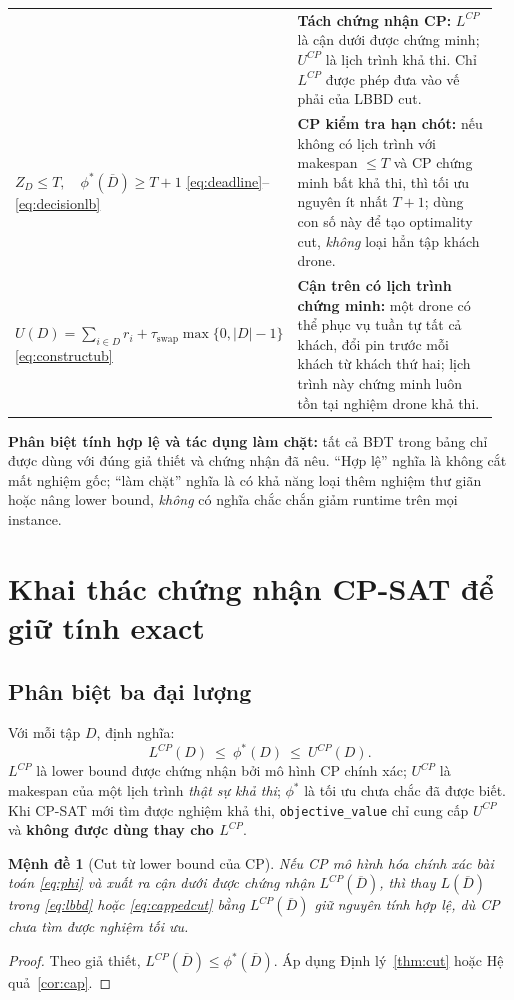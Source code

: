 \documentclass[11pt,a4paper]{article}
\theoremstyle{definition}
\theoremstyle{plain}
\newtheorem{proposition}{Mệnh đề}[section]
\theoremstyle{remark}
\newcommand{\sw}{\tau_{\mathrm{swap}}}
\newcommand{\opt}{\phi^*}
\newcommand{\barD}{\overline D}
\begin{document}
\begin{longtable}{@{}p{0.49\linewidth}p{0.47\linewidth}@{}}
& \textbf{Tách chứng nhận CP:} $L^{CP}$ là cận dưới được chứng minh; $U^{CP}$ là lịch trình khả thi. Chỉ $L^{CP}$ được phép đưa vào vế phải của LBBD cut.\\
$\displaystyle Z_D\le T,\quad\opt(\barD)\ge T+1$ \eqref{eq:deadline}--\eqref{eq:decisionlb}
& \textbf{CP kiểm tra hạn chót:} nếu không có lịch trình với makespan $\le T$ và CP chứng minh bất khả thi, thì tối ưu nguyên ít nhất $T+1$; dùng con số này để tạo optimality cut, \emph{không} loại hẳn tập khách drone.\\
$\displaystyle U(D)=\sum_{i\in D}r_i+\sw\max\{0,|D|-1\}$ \eqref{eq:constructub}
& \textbf{Cận trên có lịch trình chứng minh:} một drone có thể phục vụ tuần tự tất cả khách, đổi pin trước mỗi khách từ khách thứ hai; lịch trình này chứng minh luôn tồn tại nghiệm drone khả thi.\\
\end{longtable}
\endgroup
\noindent\textbf{Phân biệt tính hợp lệ và tác dụng làm chặt:} tất cả BĐT trong bảng chỉ được dùng với đúng giả thiết và chứng nhận đã nêu. ``Hợp lệ'' nghĩa là không cắt mất nghiệm gốc; ``làm chặt'' nghĩa là có khả năng loại thêm nghiệm thư giãn hoặc nâng lower bound, \emph{không} có nghĩa chắc chắn giảm runtime trên mọi instance.

\section{Khai thác chứng nhận CP-SAT để giữ tính exact}
\subsection{Phân biệt ba đại lượng}
Với mỗi tập $D$, định nghĩa:
\begin{equation}\label{eq:bounds}
L^{CP}(D)\ \le\ \opt(D)\ \le\ U^{CP}(D).
\end{equation}
$L^{CP}$ là lower bound được chứng nhận bởi mô hình CP chính xác; $U^{CP}$ là makespan của một lịch trình \emph{thật sự khả thi}; $\opt$ là tối ưu chưa chắc đã được biết. Khi CP-SAT mới tìm được nghiệm khả thi, \texttt{objective\_value} chỉ cung cấp $U^{CP}$ và \textbf{không được dùng thay cho $L^{CP}$}.

\begin{proposition}[Cut từ lower bound của CP]\label{prop:cpbound}
Nếu CP mô hình hóa chính xác bài toán \eqref{eq:phi} và xuất ra cận dưới được chứng nhận $L^{CP}(\barD)$, thì thay $L(\barD)$ trong \eqref{eq:lbbd} hoặc \eqref{eq:cappedcut} bằng $L^{CP}(\barD)$ giữ nguyên tính hợp lệ, dù CP chưa tìm được nghiệm tối ưu.
\end{proposition}
\begin{proof}
Theo giả thiết, $L^{CP}(\barD)\le\opt(\barD)$. Áp dụng Định lý~\ref{thm:cut} hoặc Hệ quả~\ref{cor:cap}.
\end{proof}
\end{document}
